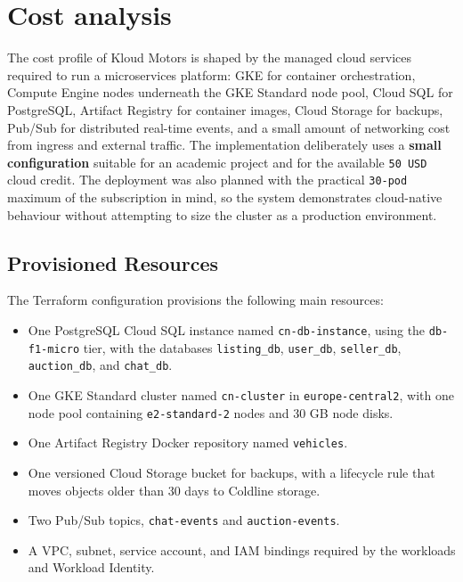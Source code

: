 \chapter{Cost analysis} \label{cap:costs}

The cost profile of Kloud Motors is shaped by the managed cloud services required to run a microservices platform: GKE for container orchestration, Compute Engine nodes underneath the GKE Standard node pool, Cloud SQL for PostgreSQL, Artifact Registry for container images, Cloud Storage for backups, Pub/Sub for distributed real-time events, and a small amount of networking cost from ingress and external traffic. The implementation deliberately uses a \textbf{small configuration} suitable for an academic project and for the available \texttt{50 USD} cloud credit. The deployment was also planned with the practical \texttt{30-pod} maximum of the subscription in mind, so the system demonstrates cloud-native behaviour without attempting to size the cluster as a production environment.

\section{Provisioned Resources}

The Terraform configuration provisions the following main resources:

\begin{itemize}
    \item One PostgreSQL Cloud SQL instance named \texttt{cn-db-instance}, using the \texttt{db-f1-micro} tier, with the databases \texttt{listing\_db}, \texttt{user\_db}, \texttt{seller\_db}, \texttt{auction\_db}, and \texttt{chat\_db}.
    \item One GKE Standard cluster named \texttt{cn-cluster} in \texttt{europe-central2}, with one node pool containing \texttt{e2-standard-2} nodes and 30 GB node disks.
    \item One Artifact Registry Docker repository named \texttt{vehicles}.
    \item One versioned Cloud Storage bucket for backups, with a lifecycle rule that moves objects older than 30 days to Coldline storage.
    \item Two Pub/Sub topics, \texttt{chat-events} and \texttt{auction-events}.
    \item A VPC, subnet, service account, and IAM bindings required by the workloads and Workload Identity.
\end{itemize}

